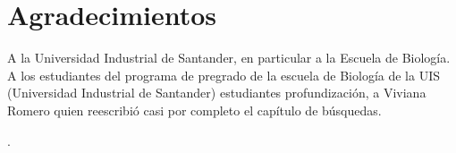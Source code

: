 \section*{Agradecimientos}
A la Universidad Industrial de Santander, en particular a la Escuela de Biolog\'ia. A los estudiantes del programa de pregrado de la escuela de Biolog\'ia de la UIS (Universidad Industrial de Santander) 
estudiantes profundizaci\'on,
a Viviana Romero quien reescribi\'o casi por completo el cap\'itulo de b\'usquedas.



.